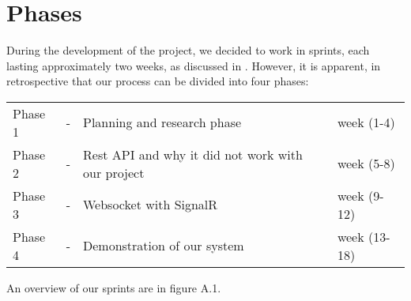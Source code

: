 \chapter{Phases}
During the development of the project, we decided to work in sprints, each lasting approximately two weeks, as discussed in . However, it is apparent, in retrospective that our process can be divided into four phases:

\begin{center}
	\begin{tabular}{lcll}
		Phase 1 & - & Planning and research phase & week (1-4) \\
		Phase 2& - & Rest API and why it did not work with our project& week (5-8) \\
		Phase 3 & - & Websocket with SignalR & week (9-12) \\
		Phase 4 & - & Demonstration of our system & week (13-18) 
	\end{tabular}
\end{center}

An overview of our sprints are in figure A.1.

%
%
%






